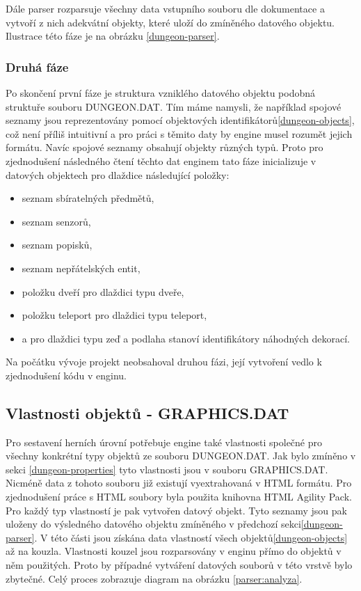 Dále parser rozparsuje všechny data vstupního souboru dle dokumentace\cite{TechnicalDocumentationFontanel05} a vytvoří z nich 
adekvátní objekty, které uloží do zmíněného datového objektu. Ilustrace této fáze je na obrázku \ref{dungeon-parser}.

\subsubsection{Druhá fáze}
Po skončení první fáze je struktura vzniklého datového objektu podobná struktuře souboru DUNGEON.DAT. Tím máme namysli, že
například spojové seznamy jsou reprezentovány pomocí objektových identifikátorů\vref{dungeon-objects}, což není příliš intuitivní a pro práci 
s těmito daty by engine musel rozumět jejich formátu. Navíc spojové seznamy obsahují objekty různých typů. Proto pro zjednodušení 
následného čtení těchto dat enginem tato fáze inicializuje v datových objektech pro dlaždice následující položky:
\begin{itemize} 
\item seznam sbíratelných předmětů,
\item seznam senzorů,
\item seznam popisků,
\item seznam nepřátelských entit,
\item položku dveří pro dlaždici typu dveře,
\item položku teleport pro dlaždici typu teleport,
\item a pro dlaždici typu zeď a podlaha stanoví identifikátory náhodných dekorací.
\end{itemize} 

Na počátku vývoje projekt neobsahoval druhou fázi, její vytvoření vedlo k zjednodušení kódu v enginu.

\subsection{Vlastnosti objektů - GRAPHICS.DAT}

Pro sestavení herních úrovní potřebuje engine také vlastnosti společné pro všechny konkrétní typy objektů ze
souboru DUNGEON.DAT. Jak bylo zmíněno v sekci \ref{dungeon-properties} tyto vlastnosti jsou v souboru GRAPHICS.DAT. Nicméně
data z tohoto souboru již existují vyextrahovaná v HTML formátu. Pro zjednodušení práce s HTML soubory byla
použita knihovna HTML Agility Pack\cite{HtmlAgilityPack}. Pro každý typ vlastností je pak vytvořen datový objekt.
Tyto seznamy jsou pak uloženy do výsledného datového objektu zmíněného v předchozí
sekci\ref{dungeon-parser}. V této části jsou získána data vlastností všech objektů\vref{dungeon-objects} až na kouzla.
Vlastnosti kouzel jsou rozparsovány v enginu přímo do objektů v něm použitých. Proto by případné vytváření datových souborů
v této vrstvě bylo zbytečné. Celý proces zobrazuje diagram na obrázku \ref{parser:analyza}.

